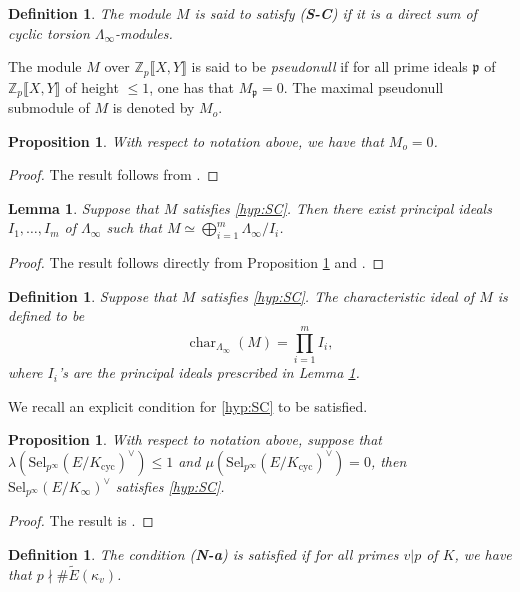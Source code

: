 \documentclass[12pt]{amsart}
\makeatletter
\newtheorem{lemma}[theorem]{Lemma}
\newtheorem{definition}[theorem]{Definition}
\newtheorem{proposition}[theorem]{Proposition}
\newcommand{\Z}{\mathbb{Z}}
\newcommand{\Sel}{\mathrm{Sel}}
\newcommand{\cyc}{\mathrm{cyc}}
\newcommand{\op}[1]{\operatorname{#1}}
\newcommand{\mylabel}[2]{#2\def\@currentlabel{#2}\label{#1}}
\numberwithin{equation}{section}
\makeatother
\begin{document}
\begin{definition}The module $M$ is said to satisfy (\mylabel{hyp:SC}{\textbf{S-C}}) if it is a direct sum of cyclic torsion $\Lambda_\infty$-modules.
\end{definition}

The module $M$ over $\Z_p\llbracket X, Y\rrbracket$ is said to be \emph{pseudonull} if for all prime ideals $\mathfrak{p}$ of $\Z_p\llbracket X, Y\rrbracket$ of height $\leq 1$, one has that $M_{\mathfrak{p}}=0$. The maximal pseudonull submodule of $M$ is denoted by $M_o$. 

\begin{proposition}\label{Mo=0}
    With respect to notation above, we have that $M_o=0$.
\end{proposition}
\begin{proof}
    The result follows from \cite[Proposition 6.1]{KLRnoncom}.
\end{proof}

\begin{lemma}
\label{lemma:structure}
Suppose that $M$ satisfies \eqref{hyp:SC}.
Then there exist principal ideals $I_1,\dots, I_m$ of $\Lambda_\infty$ such that $M\simeq \bigoplus_{i=1}^m\Lambda_\infty/I_i$.
\end{lemma}
\begin{proof}
    The result follows directly from Proposition \ref{Mo=0} and \cite[Theorem 2.4]{gajek2024conjecture}.
\end{proof}
\begin{definition}
Suppose that $M$ satisfies \eqref{hyp:SC}.
The \emph{characteristic ideal} of $M$ is defined to be
\[
\op{char}_{\Lambda_\infty}(M)=\prod_{i=1}^m I_i,
\]
where $I_i$'s are the principal ideals prescribed in Lemma \ref{lemma:structure}.
\end{definition}

We recall an explicit condition for \eqref{hyp:SC} to be satisfied. 
\begin{proposition}
\label{prop:SC-ord}
With respect to notation above, suppose that $\lambda(\Sel_{p^\infty}(E/K_\cyc)^\vee)\le 1$ and $\mu(\Sel_{p^\infty}(E/K_\cyc)^\vee)=0$, then $\Sel_{p^\infty}(E/K_\infty)^\vee$ satisfies \eqref{hyp:SC}.
\end{proposition}

\begin{proof}
    The result is \cite[Proposition 5.1]{gajek2024conjecture}.
\end{proof}

\begin{definition}The condition (\mylabel{hyp:Na}{\textbf{N-a}}) is satisfied if for all primes $v|p$ of $K$, we have that $p\nmid \#\widetilde{E}(\kappa_v)$. 
\end{definition}
\end{document}
